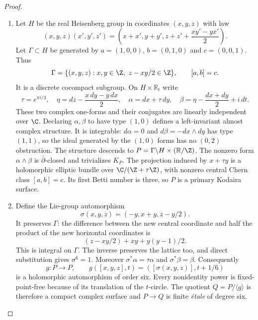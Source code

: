 \begin{proof}

\begin{enumerate}[label={$\langle1\rangle$\arabic*.},leftmargin=*]
\item Let $H$ be the real Heisenberg group in coordinates $(x,y,z)$ with law
\[
(x,y,z)(x',y',z')
=\left(x+x',y+y',z+z'+\frac{xy'-yx'}2\right).
\]
Let $\Gamma\subset H$ be generated by
$a=(1,0,0)$, $b=(0,1,0)$ and $c=(0,0,1)$. Thus
\[
\Gamma=\{(x,y,z):x,y\in\Z,\ z-xy/2\in\Z\},
\qquad [a,b]=c.
\]
It is a discrete cocompact subgroup. On $H\times\mathbb R_t$ write
\[
\tau=e^{\pi i/3},\quad
\eta=dz-\frac{x\,dy-y\,dx}{2},\quad
\alpha=dx+\tau\,dy,\quad
\beta=\eta-\frac{dx+dy}{2}+i\,dt.
\]
These two complex one-forms and their conjugates are linearly
independent over $\C$. Declaring $\alpha,\beta$ to have type $(1,0)$
defines a left-invariant almost complex structure. It is integrable:
$d\alpha=0$ and $d\beta=-dx\wedge dy$ has type $(1,1)$, so the
ideal generated by the $(1,0)$ forms has no $(0,2)$ obstruction.
The structure descends to
$P=\Gamma\backslash H\times(\mathbb R/\Z)$.
The nonzero form $\alpha\wedge\beta$ is $\bar\partial$-closed and
trivializes $K_P$. The projection induced by $x+\tau y$ is a
holomorphic elliptic bundle over $\C/(\Z+\tau\Z)$, with nonzero
central Chern class $[a,b]=c$. Its first Betti number is three, so
$P$ is a primary Kodaira surface.

\item Define the Lie-group automorphism
\[
\sigma(x,y,z)=(-y,x+y,z-y/2).
\]
It preserves $\Gamma$: the difference between the new central
coordinate and half the product of the new horizontal coordinates
is
\[
(z-xy/2)+xy+y(y-1)/2.
\]
This is integral on $\Gamma$. The inverse preserves the lattice too,
and direct substitution gives $\sigma^6=1$. Moreover
$\sigma^*\alpha=\tau\alpha$ and $\sigma^*\beta=\beta$.
Consequently
\[
g:P\longrightarrow P,\qquad
g([x,y,z],t)=([\sigma(x,y,z)],t+1/6)
\]
is a holomorphic automorphism of order six. Every nonidentity power
is fixed-point-free because of its translation of the $t$-circle.
The quotient $Q=P/\langle g\rangle$ is therefore a compact complex
surface and $P\to Q$ is finite \emph{\'etale} of degree six.


\end{enumerate}
\end{proof}

